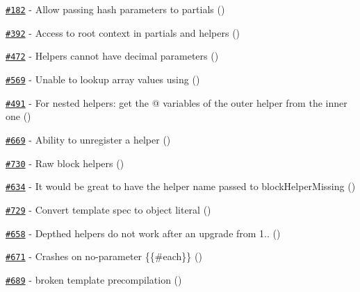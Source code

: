 \begin{DoxyItemize}
\item \href{https://github.com/wycats/handlebars.js/pull/182}{\tt \#182} -\/ Allow passing hash parameters to partials (\href{https://api.github.com/users/kpdecker}{\tt })
\item \href{https://github.com/wycats/handlebars.js/pull/392}{\tt \#392} -\/ Access to root context in partials and helpers (\href{https://api.github.com/users/kpdecker}{\tt })
\item \href{https://github.com/wycats/handlebars.js/issues/472}{\tt \#472} -\/ Helpers cannot have decimal parameters (\href{https://api.github.com/users/kayleg}{\tt })
\item \href{https://github.com/wycats/handlebars.js/pull/569}{\tt \#569} -\/ Unable to lookup array values using  (\href{https://api.github.com/users/kpdecker}{\tt })
\item \href{https://github.com/wycats/handlebars.js/pull/491}{\tt \#491} -\/ For nested helpers\+: get the @ variables of the outer helper from the inner one (\href{https://api.github.com/users/kpdecker}{\tt })
\item \href{https://github.com/wycats/handlebars.js/issues/669}{\tt \#669} -\/ Ability to unregister a helper (\href{https://api.github.com/users/dbachrach}{\tt })
\item \href{https://github.com/wycats/handlebars.js/pull/730}{\tt \#730} -\/ Raw block helpers (\href{https://api.github.com/users/kpdecker}{\tt })
\item \href{https://github.com/wycats/handlebars.js/pull/634}{\tt \#634} -\/ It would be great to have the helper name passed to {\ttfamily block\+Helper\+Missing} (\href{https://api.github.com/users/kpdecker}{\tt })
\item \href{https://github.com/wycats/handlebars.js/pull/729}{\tt \#729} -\/ Convert template spec to object literal (\href{https://api.github.com/users/kpdecker}{\tt })
\item \href{https://github.com/wycats/handlebars.js/issues/658}{\tt \#658} -\/ Depthed helpers do not work after an upgrade from 1.. (\href{https://api.github.com/users/xibxor}{\tt })
\item \href{https://github.com/wycats/handlebars.js/issues/671}{\tt \#671} -\/ Crashes on no-\/parameter \{\{\#each\}\} (\href{https://api.github.com/users/stepancheg}{\tt })
\item \href{https://github.com/wycats/handlebars.js/issues/689}{\tt \#689} -\/ broken template precompilation (\href{https://api.github.com/users/AAS}{\tt })

\end{DoxyItemize}
